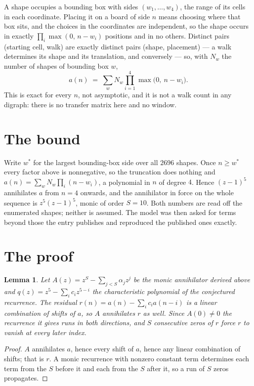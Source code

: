 \documentclass[11pt,a4paper]{article}
\theoremstyle{plain}
\newtheorem{lemma}[theorem]{Lemma}
\theoremstyle{definition}
\begin{document}
A shape occupies a bounding box with sides $(w_1,\dots,w_{4})$, the range of its cells in each
coordinate. Placing it on a board of side $n$ means choosing where that box sits, and the
choices in the coordinates are independent, so the shape occurs in exactly
$\prod_{i}\max(0,\,n-w_i)$ positions and in no others. Distinct pairs (starting cell,
walk) are exactly distinct pairs (shape, placement) --- a walk determines its shape and its
translation, and conversely --- so, with $N_w$ the number of shapes of bounding box $w$,
\[
a(n)\;=\;\sum_{w} N_w \prod_{i=1}^{4}\max\bigl(0,\ n-w_i\bigr).
\]
This is exact for every $n$, not asymptotic, and it is not a walk count in any digraph: there is
no transfer matrix here and no window.

\section{The bound}

Write $w^\ast$ for the largest bounding-box side over all $2696$ shapes. Once $n\ge w^\ast$
every factor above is nonnegative, so the truncation does nothing and
$a(n)=\sum_w N_w\prod_i(n-w_i)$, a polynomial in $n$ of degree $4$. Hence $(z-1)^{5}$
annihilates $a$ from $n=4$ onwards, and the annihilator in force on the whole sequence is
$z^{5}(z-1)^{5}$, monic of order $S=10$. Both numbers are read off the enumerated
shapes; neither is assumed. The model was then asked for terms beyond those the entry publishes
and reproduced the published ones exactly.

\section{The proof}

\begin{lemma}\label{lem:crit}
Let $A(z)=z^S-\sum_{j<S}\alpha_jz^{j}$ be the monic annihilator derived above and
$q(z)=z^{5}-\sum_ic_iz^{5-i}$ the characteristic polynomial of the conjectured
recurrence. The residual $r(n)=a(n)-\sum_ic_ia(n-i)$ is a linear combination of shifts of $a$,
so $A$ annihilates $r$ as well. Since $A(0)\ne0$ the recurrence it gives runs in both
directions, and $S$ consecutive zeros of $r$ force $r$ to vanish at every later index.
\end{lemma}

\begin{proof}
$A$ annihilates $a$, hence every shift of $a$, hence any linear combination of shifts; that is
$r$. A monic recurrence with nonzero constant term determines each term from the $S$ before it
and each from the $S$ after it, so a run of $S$ zeros propagates.
\end{proof}
\end{document}
